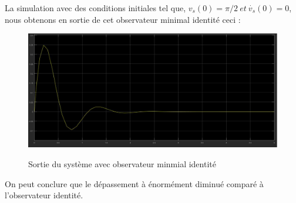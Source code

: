 \par La simulation avec des conditions initiales tel que, $v_s(0)=\pi/2~et~\dot{v_s}(0)=0$, nous obtenons en sortie de cet observateur minimal identité ceci :
\begin{figure}[h!]
\centering
\includegraphics[scale = 0.35]{FFF1.JPG}\\[0.7 cm] 
\caption{Sortie du système avec observateur minmial identité}
\end{figure}
\par On peut conclure que le dépassement à énormément diminué comparé à l'observateur identité.



